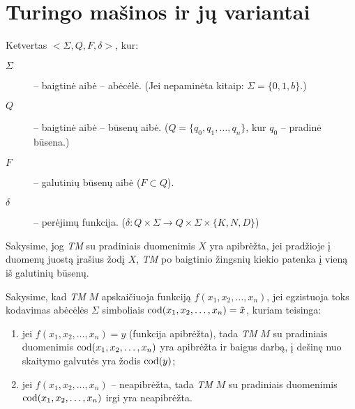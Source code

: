 \chapter{Turingo mašinos ir jų variantai}

\begin{defn}
  Ketvertas $<\Sigma,Q,F,\delta>$, kur:
  \begin{description}
    \item[$\Sigma$] – baigtinė aibė – abėcėlė. (Jei nepaminėta kitaip:
      $\Sigma = \{0, 1, b\}$.)
    \item[$Q$] – baigtinė aibė – būsenų aibė. 
      ($Q = \{q_0,q_1,\dotsc,q_n\}$, kur $q_0$ – pradinė būsena.)
    \item[$F$] – galutinių būsenų aibė ($F \subset Q$).
    \item[$\delta$] – perėjimų funkcija. 
      ($\delta: Q \times \Sigma \to Q \times \Sigma \times \{K,N,D\}$)
  \end{description}
\end{defn}

\begin{defn}
  Sakysime, jog \emph{TM} su pradiniais duomenimis $X$ yra apibrėžta, jei 
  pradžioje į duomenų juostą įrašius žodį $X$, \emph{TM} po baigtinio
  žingsnių kiekio patenka į vieną iš galutinių būsenų.
\end{defn}

\begin{defn}
  Sakysime, kad \emph{TM} $M$ apskaičiuoja funkciją 
  $f(x_1,x_2,\dotsc,x_n)$, jei egzistuoja toks kodavimas abėcėlės 
  $\Sigma$ simboliais $\operatorname{cod}(x_1,x_2,\dotsc,x_n) = \tilde{x}$, kuriam
  teisinga:
  \begin{enumerate}
    \item
      \begin{sloppypar}
        jei $f(x_1,x_2,\dotsc,x_n) = y$ (funkcija apibrėžta), tada
        \emph{TM} $M$ su pradiniais duomenimis $\operatorname{cod}(x_1,x_2,\dotsc,x_n)$
        yra apibrėžta ir baigus darbą, į dešinę nuo skaitymo galvutės yra
        žodis $\operatorname{cod}(y)$;
      \end{sloppypar}
    \item jei $f(x_1,x_2,\dotsc,x_n)$ – neapibrėžta, tada \emph{TM} $M$
      su pradiniais duomenimis $\operatorname{cod}(x_1,x_2,\dotsc,x_n)$ irgi yra
      neapibrėžta.
  \end{enumerate}
\end{defn}

